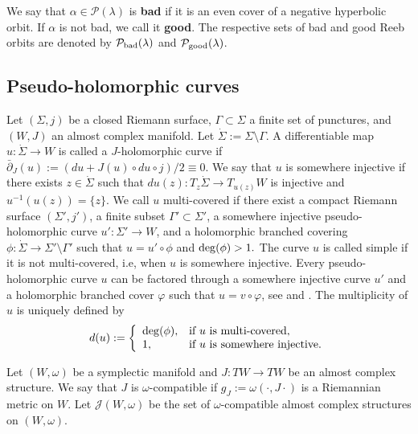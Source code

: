 \documentclass{amsart}
\begin{document}
We say that $\alpha \in \mathcal{P}(\lambda)$ is {\bf bad} if it is an even cover of a negative hyperbolic orbit. If $\alpha$ is not bad, we call it {\bf good}. The respective sets of bad and good Reeb orbits are denoted by $\mathcal{P}_{\rm bad}(\lambda)$ and $\mathcal{P}_{\rm good}(\lambda)$.





\subsection{Pseudo-holomorphic curves} Let $(\Sigma,j)$ be a closed Riemann surface, $\Gamma \subset \Sigma$ a finite set of punctures, and $(W,J)$ an almost complex manifold. Let $\dot \Sigma := \Sigma \setminus \Gamma$. A differentiable map $u:\dot \Sigma \to W$ is  called a $J$-holomorphic curve if 
$
\bar{\partial}_J(u):=(du+J(u) \circ du \circ j)/2\equiv 0.
$
We say that $u$ is somewhere injective if there exists $z \in \dot \Sigma$ such that $du(z):T_z\dot \Sigma \to T_{u(z)}W$ is injective and $u^{-1}\left(u(z)\right)=\{z\}$.
We call $u$ multi-covered if there exist a compact Riemann surface $(\Sigma',j')$, a finite subset $\Gamma'\subset \Sigma'$, a somewhere injective pseudo-holomorphic curve $u' :\Sigma' \to W$, and a holomorphic branched covering $\phi:\dot \Sigma \to \Sigma'\setminus \Gamma'$ such that
$u=u' \circ \phi$ and ${\rm deg}(\phi)>1.$
The curve $u$ is called simple if it is not multi-covered, i.e, when $u$ is somewhere injective.
Every pseudo-holomorphic curve $u$ can be factored through a somewhere injective curve $u'$ and a holomorphic branched cover $\varphi$ such that $u=v \circ \varphi$, see  \cite[Appendix]{prop2}  and \cite{mcduff2004j}. The multiplicity of  $u$ is uniquely defined by
\begin{equation}
d(u):=\left\{\begin{array}{ll}
 {\rm deg}(\phi),    & \mbox{if } u \mbox{ is multi-covered},  \\
   1,  & \mbox{if } u \mbox{ is somewhere injective}.
\end{array}
\right.
\label{d2}
\end{equation}

Let $(W, \omega)$ be a symplectic manifold and $J:TW \to TW$ be an almost complex structure. We say that $J$ is $\omega$-compatible if $g_J:=\omega(\cdot ,J \cdot)$ is a Riemannian metric on $W$.  
Let $\mathcal{J}(W,\omega)$ be the set of $\omega$-compatible almost complex structures on $(W,\omega)$.
\end{document}
